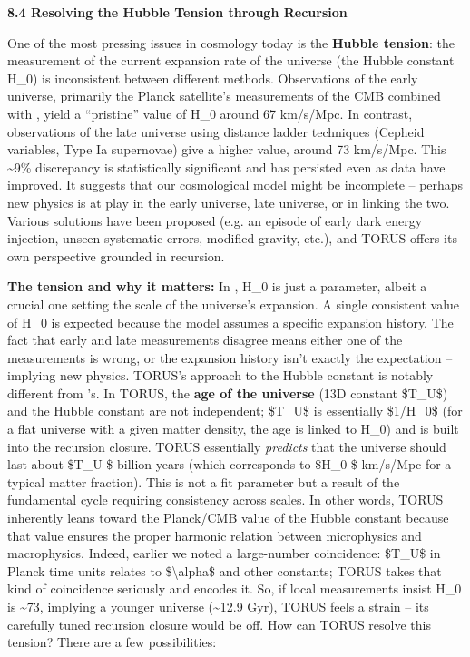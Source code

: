 \documentclass[
]{article}
\begin{document}
{\textbf{8.4 Resolving the Hubble Tension through Recursion}

One of the most pressing issues in cosmology today is the \textbf{Hubble
tension}: the measurement of the current expansion rate of the universe
(the Hubble constant
H_{0}) is inconsistent
between different methods. Observations of the early universe, primarily
the Planck satellite's measurements of the CMB combined with \LambdaCDM, yield
a ``pristine'' value of
H_{0}{} around 67
km/s/Mpc. In contrast, observations of the late universe using distance
ladder techniques (Cepheid variables, Type Ia supernovae) give a higher
value, around 73 km/s/Mpc. This \textasciitilde9\% discrepancy is
statistically significant and has persisted even as data have improved.
It suggests that our cosmological model might be incomplete -- perhaps
new physics is at play in the early universe, late universe, or in
linking the two. Various solutions have been proposed (e.g. an episode
of early dark energy injection, unseen systematic errors, modified
gravity, etc.), and TORUS offers its own perspective grounded in
recursion.

\textbf{The tension and why it matters:} In \LambdaCDM,
H_{0}{} is just a
parameter, albeit a crucial one setting the scale of the universe's
expansion. A single consistent value of
H_{0}{} is expected
because the model assumes a specific expansion history. The fact that
early and late measurements disagree means either one of the
measurements is wrong, or the expansion history isn't exactly the \LambdaCDM
expectation -- implying new physics. TORUS's approach to the Hubble
constant is notably different from \LambdaCDM's. In TORUS, the \textbf{age of
the universe} (13D constant \$T\_U\$) and the Hubble constant are not
independent; \$T\_U\$ is essentially \$1/H\_0\$ (for a flat universe
with a given matter density, the age is linked to
H_{0}) and is built into
the recursion closure. TORUS essentially \emph{predicts} that the
universe should last about \$T\_U \$ billion years (which
corresponds to \$H\_0 \$ km/s/Mpc for a typical matter
fraction)\hspace{0pt}. This is not a fit parameter but a result of the
fundamental cycle requiring consistency across scales. In other words,
TORUS inherently leans toward the Planck/CMB value of the Hubble
constant because that value ensures the proper harmonic relation between
microphysics and macrophysics. Indeed, earlier we noted a large-number
coincidence: \$T\_U\$ in Planck time units relates to
\$\textbackslash alpha\$ and other constants; TORUS takes that kind of
coincidence seriously and encodes it. So, if local measurements insist
H_{0}{} is
\textasciitilde73, implying a younger universe (\textasciitilde12.9
Gyr), TORUS feels a strain -- its carefully tuned recursion closure
would be off\hspace{0pt}. How can TORUS resolve this tension? There are
a few possibilities:

}
\end{document}
